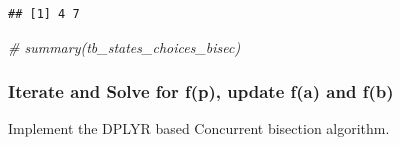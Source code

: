 \documentclass[
]{book}
\newenvironment{Shaded}{\begin{snugshade}}{\end{snugshade}}
\newcommand{\CommentTok}[1]{\textcolor[rgb]{0.56,0.35,0.01}{\textit{#1}}}
\begin{document}
\begin{verbatim}
## [1] 4 7
\end{verbatim}

\begin{Shaded}
\begin{Highlighting}[]
\CommentTok{\# summary(tb\_states\_choices\_bisec)}
\end{Highlighting}
\end{Shaded}

\hypertarget{iterate-and-solve-for-fp-update-fa-and-fb}{%
\subsubsection{Iterate and Solve for f(p), update f(a) and f(b)}\label{iterate-and-solve-for-fp-update-fa-and-fb}}

Implement the DPLYR based Concurrent bisection algorithm.
\end{document}
